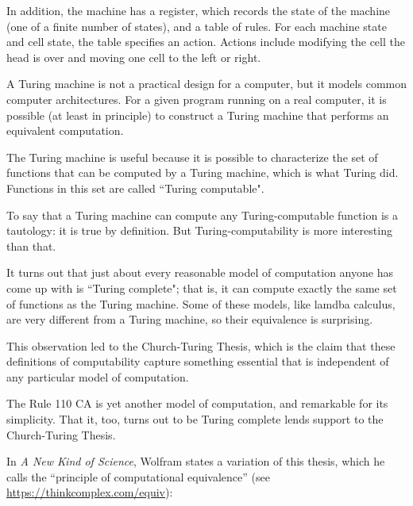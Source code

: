 \documentclass[12pt]{book}
\theoremstyle{exercise}
\begin{document}
In addition, the machine has a register, which records the state
of the machine (one of a finite number of states), and a table
of rules.  For each machine state and cell state, the table
specifies an action.  Actions include modifying the cell
the head is over and moving one cell to the left or right.


A Turing machine is not a practical design for a computer, but it
models common computer architectures.  For a given program running on
a real computer, it is possible (at least in principle) to construct a
Turing machine that performs an equivalent computation.

The Turing machine is useful because it is possible to characterize
the set of functions that can be computed by a Turing machine,
which is what Turing did.  Functions in this set are
called ``Turing computable".


To say that a Turing machine can compute any Turing-computable
function is a tautology: it is true by definition.  But
Turing-computability is more interesting than that.


It turns out that just about every reasonable model of computation
anyone has come up with is ``Turing complete"; that is, it can compute
exactly the same set of functions as the Turing machine.
Some of these models, like lamdba calculus, are very different
from a Turing machine, so their equivalence is surprising.


This observation led to the Church-Turing Thesis, which is the claim that these definitions of computability capture something essential that is independent of any particular model of computation.

The Rule 110 CA is yet another model of computation, and remarkable
for its simplicity.  That it, too, turns out to be Turing complete lends
support to the Church-Turing Thesis.

In {\em A New Kind of Science}, Wolfram states a variation of this
thesis, which he calls the ``principle of computational equivalence'' (see
\url{https://thinkcomplex.com/equiv}):

\end{document}
